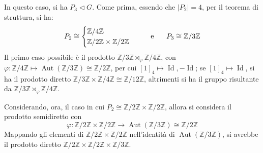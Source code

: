 \documentclass[12pt]{scrartcl}
\theoremstyle{style}
\numberwithin{equation}{subsection}
\begin{document}
\begin{itemize}
		In questo caso, si ha $P_3 \lhd G$.
		Come prima, essendo che $|P_2| = 4$, per il teorema di struttura, si ha:
		\[
		P_2\cong \begin{cases}
			\mathbb{Z} / 4 \mathbb{Z}\\
			\mathbb{Z} / 2\mathbb{Z} \times  \mathbb{Z} / 2\mathbb{Z}
		\end{cases}
		\hspace{.5cm} \text{ e } \hspace{.5cm} P_3\cong \mathbb{Z}/3\mathbb{Z}
		\] 
		Il primo caso possibile \`e il prodotto $\mathbb{Z} / 3\mathbb{Z} \rtimes _\varphi \mathbb{Z}/ 4 \mathbb{Z}$, con $\varphi : \mathbb{Z}/ 4\mathbb{Z} \longmapsto \operatorname{Aut} (\mathbb{Z}/3\mathbb{Z})\cong \mathbb{Z} / 2\mathbb{Z}$, per cui $[1]_4 \longmapsto \operatorname{Id} , -\operatorname{Id}$; se $[1]_4 \mapsto \operatorname{Id} $, si ha il prodotto diretto $\mathbb{Z} / 3\mathbb{Z} \times \mathbb{Z} / 4\mathbb{Z} \cong \mathbb{Z}/12\mathbb{Z}$, altrimenti si ha il gruppo risultante da $\mathbb{Z}/ 3\mathbb{Z}\rtimes _\varphi \mathbb{Z}/4\mathbb{Z}$.

		Considerando, ora, il caso in cui $P_2 \cong \mathbb{Z} /2 \mathbb{Z} \times  \mathbb{Z}/2\mathbb{Z}$, allora si considera il prodotto semidiretto con 
		\[
		\varphi : \mathbb{Z} / 2\mathbb{Z} \times \mathbb{Z}/2\mathbb{Z} \longrightarrow \operatorname{Aut} (\mathbb{Z}/3\mathbb{Z}) \cong \mathbb{Z}/2\mathbb{Z}
		\] 
		Mappando gli elementi di $\mathbb{Z}/2\mathbb{Z}\times \mathbb{Z}/2\mathbb{Z}$ nell'identit\`a di $\operatorname{Aut} (\mathbb{Z}/3\mathbb{Z})$, si avrebbe il prodotto diretto $\mathbb{Z}/2\mathbb{Z} \times \mathbb{Z}/2\mathbb{Z} \times \mathbb{Z}/3\mathbb{Z}$.


\end{itemize}
\end{document}
